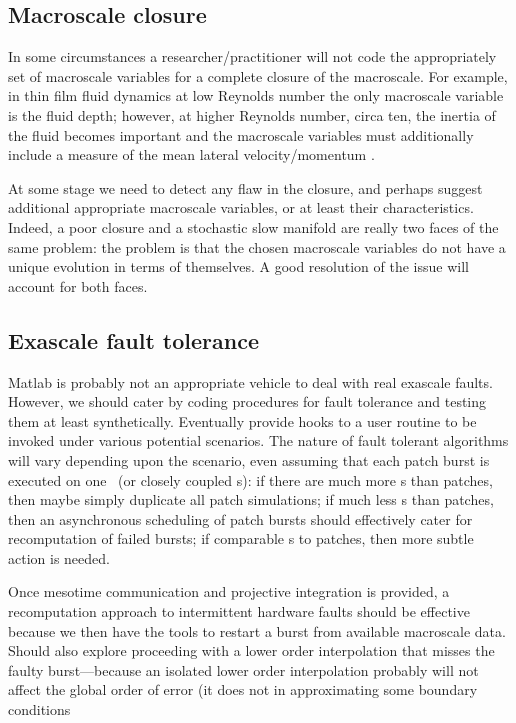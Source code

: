 \subsection{Macroscale closure}

In some circumstances a researcher\slash practitioner will not code the appropriately set of macroscale variables for a complete closure of the macroscale.
For example, in thin film fluid dynamics at low Reynolds number the only macroscale variable is the fluid depth; however, at higher Reynolds number, circa ten, the inertia of the fluid becomes important and the macroscale variables must additionally include a measure of the mean lateral velocity\slash momentum \citep[e.g.]{Roberts99b}.

At some stage we need to detect any flaw in the closure, and perhaps suggest additional appropriate macroscale variables, or at least their characteristics.
Indeed, a poor closure and a stochastic slow manifold are really two faces of the same problem: the problem is that the chosen macroscale variables do not have a unique evolution in terms of themselves. 
A good resolution of the issue will account for both faces.




\subsection{Exascale fault tolerance}

Matlab is probably not an appropriate vehicle to deal with real exascale faults.  
However, we should cater by coding procedures for fault tolerance and testing them at least synthetically.
Eventually provide hooks to a user routine to be invoked under various potential scenarios.
The nature of fault tolerant algorithms will vary depending upon the scenario, even assuming that each patch burst is executed on one \cpu\ (or closely coupled \cpu{}s): if there are much more \cpu{}s than patches, then maybe simply duplicate all patch simulations;  if much less \cpu{}s than patches, then an asynchronous scheduling of patch bursts should effectively cater for recomputation of failed bursts; if comparable \cpu{}s to patches, then more subtle action is needed.

Once mesotime communication and projective integration is provided, a recomputation approach to intermittent hardware faults should be effective because we then have the tools to restart a burst from available macroscale data.
Should also explore proceeding with a lower order interpolation that misses the faulty burst---because an isolated lower order interpolation probably will not affect the global order of error (it does not in approximating some boundary conditions \citep{Gustafsson1975, Svard2006}




